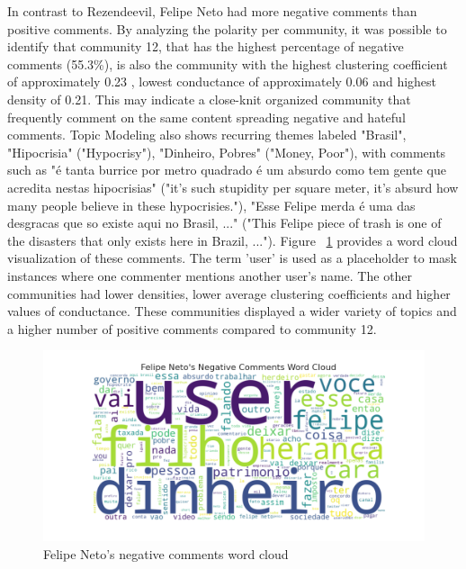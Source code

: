 \documentclass[sigconf]{acmart}
\begin{document}
In contrast to Rezendeevil, Felipe Neto had more negative comments than positive comments. 
By analyzing the polarity per community, it was possible to identify that community 12, 
that has the highest percentage of negative comments (55.3\%), is also the community with the highest clustering 
coefficient of approximately 0.23 , lowest conductance of approximately 0.06 and highest density 
of 0.21. This may indicate a close-knit organized community that frequently comment on the 
same content spreading negative and hateful comments. 
Topic Modeling also shows recurring themes labeled "Brasil", "Hipocrisia" 
("Hypocrisy"), "Dinheiro, Pobres" ("Money, Poor"), with comments such as 
"é tanta burrice por metro quadrado é um absurdo como tem gente que acredita nestas hipocrisias" 
("it's such stupidity per square meter, it's absurd how many people believe in these hypocrisies."),
"Esse Felipe merda é uma das desgracas que so existe aqui no Brasil, ..." 
("This Felipe piece of trash is one of the disasters that only exists here in Brazil, ..."). 
Figure ~\ref{fig:felipeneto_comments} provides a word cloud visualization of these comments.
The term 'user' is used as a placeholder to mask instances where one commenter mentions another user's 
name.
The other communities had lower densities, lower average clustering coefficients and higher values 
of conductance. These communities displayed a wider variety of topics and a higher number of positive 
comments compared to community 12. 

\begin{figure}[hbt!]
    \centering
    \includegraphics[keepaspectratio,width=\linewidth]{./imgs/felipeneto/negative_comments.png}
    \caption[width=\textwidth]{Felipe Neto's negative comments word cloud}
    \label{fig:felipeneto_comments}
\end{figure}
\end{document}
